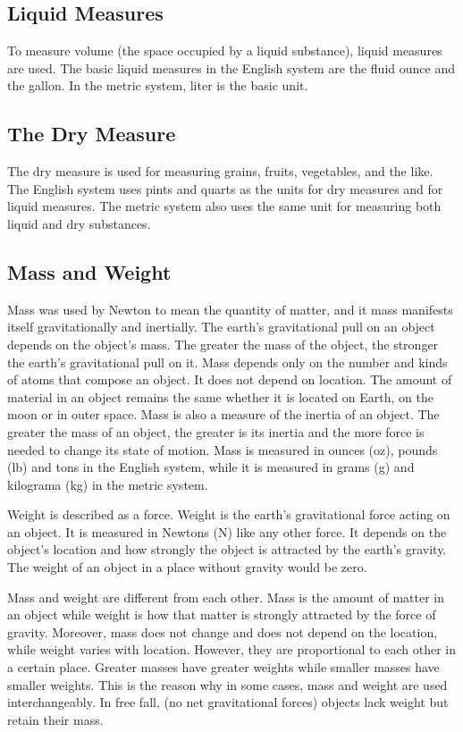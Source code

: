 \subsection*{Liquid Measures}
To measure volume (the space occupied by a liquid substance), liquid measures are
used. The basic liquid measures in the English system are the fluid ounce and the gallon. In
the metric system, liter is the basic unit.

\subsection*{The Dry Measure}
The dry measure is used for measuring grains, fruits, vegetables, and the like. The
English system uses pints and quarts as the units for dry measures and for liquid measures.
The metric system also uses the same unit for measuring both liquid and dry substances.

\subsection*{Mass and Weight}
Mass was used by Newton to mean the quantity of matter, and it mass manifests
itself gravitationally and inertially. The earth’s gravitational pull on an object depends on the
object’s mass. The greater the mass of the object, the stronger the earth’s gravitational pull
on it. Mass depends only on the number and kinds of atoms that compose an object. It
does not depend on location. The amount of material in an object remains the same
whether it is located on Earth, on the moon or in outer space. Mass is also a measure of the
inertia of an object. The greater the mass of an object, the greater is its inertia and the more
force is needed to change its state of motion. Mass is measured in ounces (oz), pounds (lb)
and tons in the English system, while it is measured in grams (g) and kilograma (kg) in the
metric system.

Weight is described as a force. Weight is the earth’s gravitational force acting on an
object. It is measured in Newtons (N) like any other force. It depends on the object’s
location and how strongly the object is attracted by the earth’s gravity. The weight of an
object in a place without gravity would be zero.

Mass and weight are different from each other. Mass is the amount of matter in an
object while weight is how that matter is strongly attracted by the force of gravity.
Moreover, mass does not change and does not depend on the location, while weight varies
with location. However, they are proportional to each other in a certain place. Greater
masses have greater weights while smaller masses have smaller weights. This is the reason
why in some cases, mass and weight are used interchangeably. In free fall, (no net
gravitational forces) objects lack weight but retain their mass.

